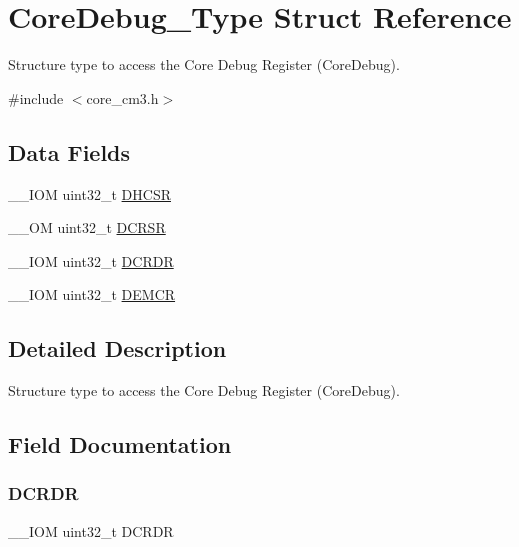\hypertarget{struct_core_debug___type}{}\section{Core\+Debug\+\_\+\+Type Struct Reference}
\label{struct_core_debug___type}


Structure type to access the Core Debug Register (Core\+Debug).  




{\ttfamily \#include $<$core\+\_\+cm3.\+h$>$}

\subsection*{Data Fields}
\begin{DoxyCompactItemize}
\item 
\+\_\+\+\_\+\+I\+OM uint32\+\_\+t \mbox{\hyperlink{struct_core_debug___type_a94ca828091a9226ab6684fbf30e52909}{D\+H\+C\+SR}}
\item 
\+\_\+\+\_\+\+OM uint32\+\_\+t \mbox{\hyperlink{struct_core_debug___type_ab74a9ec90ad18e4f7a20362d362b754a}{D\+C\+R\+SR}}
\item 
\+\_\+\+\_\+\+I\+OM uint32\+\_\+t \mbox{\hyperlink{struct_core_debug___type_ad1dbd0dd98b6d9327f70545e0081ddbf}{D\+C\+R\+DR}}
\item 
\+\_\+\+\_\+\+I\+OM uint32\+\_\+t \mbox{\hyperlink{struct_core_debug___type_aa99de5f8c609f10c25ed51f57b2edd74}{D\+E\+M\+CR}}
\end{DoxyCompactItemize}


\subsection{Detailed Description}
Structure type to access the Core Debug Register (Core\+Debug). 

\subsection{Field Documentation}
\mbox{\label{struct_core_debug___type_ad1dbd0dd98b6d9327f70545e0081ddbf}} 
\subsubsection{\texorpdfstring{D\+C\+R\+DR}{DCRDR}}
{\footnotesize\ttfamily \+\_\+\+\_\+\+I\+OM uint32\+\_\+t D\+C\+R\+DR}

